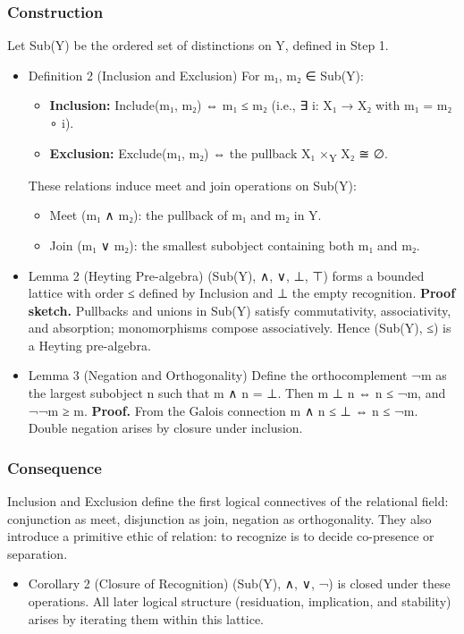 \documentclass[11pt]{article}
\begin{document}
\subsubsection*{Construction}
\label{sec:org7981c89}
Let Sub(Y) be the ordered set of distinctions on Y, defined in Step 1.
\begin{itemize}
\item Definition 2 (Inclusion and Exclusion)
\label{sec:orgda8233a}
For m₁, m₂ ∈ Sub(Y):

\begin{itemize}
\item \textbf{Inclusion:}  Include(m₁, m₂) ⇔ m₁ ≤ m₂ (i.e., ∃ i: X₁ → X₂ with m₁ = m₂ ∘ i).
\item \textbf{Exclusion:}  Exclude(m₁, m₂) ⇔ the pullback X₁ ×\textsubscript{Y} X₂ ≅ ∅.
\end{itemize}

These relations induce meet and join operations on Sub(Y):

\begin{itemize}
\item Meet (m₁ ∧ m₂): the pullback of m₁ and m₂ in Y.
\item Join (m₁ ∨ m₂): the smallest subobject containing both m₁ and m₂.
\end{itemize}
\item Lemma 2 (Heyting Pre-algebra)
\label{sec:orgdcfeebc}
(Sub(Y), ∧, ∨, ⊥, ⊤) forms a bounded lattice with order ≤ defined by Inclusion and ⊥ the empty recognition.  
\textbf{Proof sketch.}  Pullbacks and unions in Sub(Y) satisfy commutativity, associativity, and absorption; monomorphisms compose associatively. Hence (Sub(Y), ≤) is a Heyting pre-algebra.
\item Lemma 3 (Negation and Orthogonality)
\label{sec:orge77bc48}
Define the orthocomplement ¬m as the largest subobject n such that m ∧ n = ⊥.  
Then m ⊥ n ⇔ n ≤ ¬m, and ¬¬m ≥ m.  
\textbf{Proof.}  From the Galois connection m ∧ n ≤ ⊥ ⇔ n ≤ ¬m. Double negation arises by closure under inclusion.
\end{itemize}
\subsubsection*{Consequence}
\label{sec:org1bf4d86}
Inclusion and Exclusion define the first logical connectives of the relational field: conjunction as meet, disjunction as join, negation as orthogonality.  
They also introduce a primitive ethic of relation: to recognize is to decide co-presence or separation.
\begin{itemize}
\item Corollary 2 (Closure of Recognition)
\label{sec:org6f6dee6}
(Sub(Y), ∧, ∨, ¬) is closed under these operations.  
All later logical structure (residuation, implication, and stability) arises by iterating them within this lattice.
\end{itemize}
\end{document}
